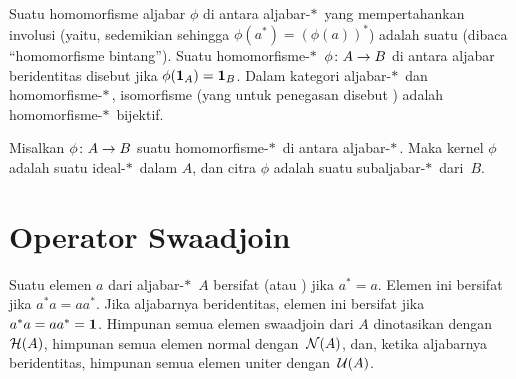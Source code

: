 \begin{defn} Suatu homomorfisme aljabar $\phi$ di antara aljabar-$*\,$ yang mempertahankan
involusi (yaitu, sedemikian sehingga $\phi(a^*) = (\phi(a))^*$) adalah suatu
 (dibaca ``homomorfisme bintang''). Suatu homomorfisme-$*\,$ $\phi\colon A \rightarrow B$ di antara aljabar beridentitas disebut
 jika $\phi(\mathbf{1}_A) = \mathbf{1}_B$.  Dalam kategori aljabar-$*\,$ dan homomorfisme-$*\,$, isomorfisme (yang untuk penegasan disebut
) adalah homomorfisme-$*\,$ bijektif.
\end{defn}

\begin{prop}\label{0010952} Misalkan $\phi\colon A \rightarrow B$ suatu homomorfisme-$*\,$ di antara aljabar-$*\,$. Maka
kernel $\phi$ adalah suatu ideal-$*\,$ dalam $A$, dan citra $\phi$ adalah suatu
subaljabar-$*\,$ dari~$B$.
\end{prop}
















\section{Operator Swaadjoin}
\begin{defn} Suatu elemen $a$ dari aljabar-$*\,$ $A$ bersifat
 (atau
) jika $a^* = a$.  Elemen ini bersifat
 jika $a^*a = aa^*$. Jika aljabarnya beridentitas, elemen ini bersifat
 jika $a^*a = aa^* = \mathbf{1}$. Himpunan semua elemen swaadjoin dari $A$
dinotasikan dengan
$\mathcal{H}(A)$, himpunan semua elemen normal
dengan~$\mathcal{N}(A)$, dan, ketika aljabarnya beridentitas, himpunan semua elemen uniter
dengan~$\mathcal{U}(A)$.
\end{defn}


